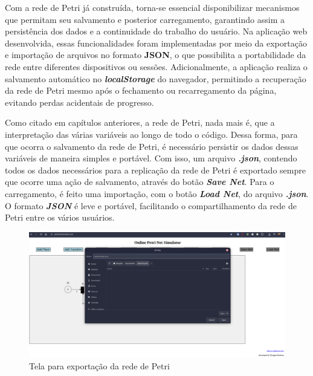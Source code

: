 \documentclass[
	12pt,				%
	openright,			%
	oneside,			%
	a4paper,			%
	english,			%
	brazil				%
	]{abntex2}
\begin{document}
Com a rede de Petri já construída, torna-se essencial disponibilizar mecanismos que permitam seu salvamento e posterior carregamento, garantindo assim a persistência dos dados e a continuidade do trabalho do usuário. Na aplicação web desenvolvida, essas funcionalidades foram implementadas por meio da exportação e importação de arquivos no formato \textbf{JSON}, o que possibilita a portabilidade da rede entre diferentes dispositivos ou sessões. Adicionalmente, a aplicação realiza o salvamento automático no \textbf{\textit{localStorage}} do navegador, permitindo a recuperação da rede de Petri mesmo após o fechamento ou recarregamento da página, evitando perdas acidentais de progresso.

Como citado em capítulos anteriores, a rede de Petri, nada mais é, que a interpretação das várias variáveis ao longo de todo o código. Dessa forma, para que ocorra o salvamento da rede de Petri, é necessário persistir os dados dessas variáveis de maneira simples e portável. Com isso, um arquivo \textbf{\textit{.json}}, contendo todos os dados necessários para a replicação da rede de Petri é exportado sempre que ocorre uma ação de salvamento, através do botão \textbf{\textit{Save Net}}. Para o carregamento, é feito uma importação, com o botão \textbf{\textit{Load Net}}, do arquivo \textbf{\textit{.json}}. O formato \textbf{\textit{JSON}} é leve e portável, facilitando o compartilhamento da rede de Petri entre os vários usuários.   

\begin{figure}[ht] 
	\centering
	\includegraphics[scale=0.3]{figuras/saveNet.png}
	\caption[Tela para exportação da rede de Petri]{Tela para exportação da rede de Petri}
	\label{fig:saveNet}
\end{figure}
\FloatBarrier
\end{document}
